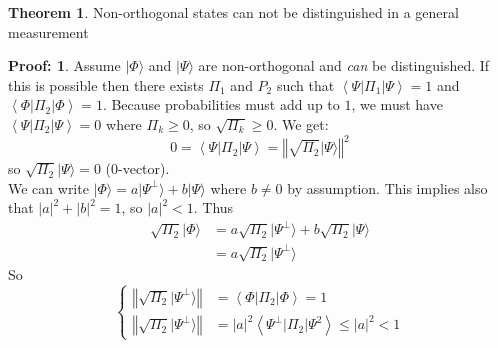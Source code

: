 \documentclass[12pt]{book}
\theoremstyle{definition}
\newtheorem*{theo}{\bfseries Theorem}
\newtheorem*{prf}{Proof:}
\newcommand{\norm}[1]{\left\Vert {#1}\right\Vert}
\newcommand{\scalar}[1]{\left\langle {#1}\right\rangle}
\newcommand{\abs}[1]{\left\vert {#1}\right\vert}
\newcommand{\ket}[1]{\vert {#1} \rangle}
\begin{document}
\begin{theo}
  Non-orthogonal states can not be distinguished in a general measurement
\end{theo}

\begin{prf}
  Assume $\ket{\Phi}$ and $\ket{\Psi}$ are non-orthogonal and \emph{can} be distinguished. If this is possible then there exists $\Pi_1$ and $P_2$ such that $\scalar{\Psi \vert \Pi_1 \vert \Psi} = 1$ and $\scalar{\Phi \vert \Pi_2 \vert \Phi} = 1$.
  Because probabilities must add up to $1$, we must have $\scalar{\Psi \vert \Pi_2 \vert \Psi} = 0$ where $\Pi_k \geq 0$, so $\sqrt{\Pi_k} \geq 0$. We get:
  \begin{equation*}
    0 = \scalar{\Psi \vert \Pi_2 \vert \Psi} = \norm{\sqrt{\Pi_2} \ket{\Psi}}^2
  \end{equation*}
  so $\sqrt{\Pi_2} \ket{\Psi} = 0$ ($0$-vector). \\
  We can write $\ket{\Phi} = a \ket{\Psi^\perp} + b \ket{\Psi}$ where $b \neq 0$ by assumption. This implies also that $\abs{a}^2 + \abs{b}^2 = 1$, so $\abs{a}^2 < 1$. Thus
  \begin{align*}
    \sqrt{\Pi_2} \ket{\Phi} & = a \sqrt{\Pi_2} \ket{\Psi^\perp} + b \sqrt{\Pi_2} \ket{\Psi} \\
    & = a \sqrt{\Pi_2} \ket{\Psi^\perp}
  \end{align*}
  So
  \begin{equation*}
    \begin{cases}
      \norm{\sqrt{\Pi_2} \ket{\Psi^\perp}} & = \scalar{\Phi \vert \Pi_2 \vert \Phi} = 1 \\
      \norm{\sqrt{\Pi_2} \ket{\Psi^\perp}} & = \abs{a}^2 \scalar{\Psi^\perp \vert \Pi_2 \vert \Psi^2} \leq \abs{a}^2 < 1
    \end{cases}
  \end{equation*}
\end{prf}
\end{document}
